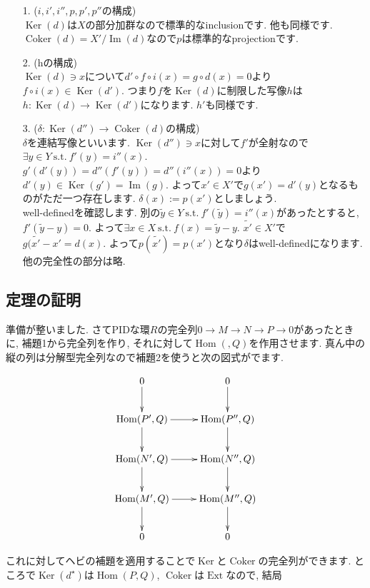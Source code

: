 \documentclass{jsarticle}
\newcommand{\makeop}[1]{\mathop{\mathrm{#1}}\nolimits}
\def\Im{\makeop{Im}}
\def\Ker{\makeop{Ker}}
\def\Hom{\makeop{Hom}}
\def\Ext{\makeop{Ext}}
\def\Coker{\makeop{Coker}}
\def\suchthat{\mathrm{\ s.t.\ }}
\theoremstyle{definition}
\numberwithin{theorem}{section}
\begin{document}
\begin{itemize}
\item[1.] ($i, i', i'', p, p', p''$の構成)\\
$\Ker(d)$は$X$の部分加群なので標準的なinclusionです. 他も同様です. $\Coker(d) = X'/\Im(d)$なので$p$は標準的なprojectionです.

\item[2.] (hの構成)\\
$\Ker(d)\ni x$について$d'\circ f\circ i(x) = g\circ d(x) = 0$より$f\circ i(x) \in \Ker(d')$. つまり$f$を$\Ker(d)$に制限した写像$h$は$h : \Ker(d) \rightarrow \Ker(d')$になります. $h'$も同様です. 

\item[3.] ($\delta: \Ker(d'') \rightarrow \Coker(d)$の構成)\\
$\delta$を連結写像といいます. $\Ker(d'') \ni x$に対して$f'$が全射なので$\exists y \in Y \suchthat f'(y) = i''(x)$. $g'(d'(y)) = d''(f'(y)) = d''(i''(x)) = 0$より$d'(y) \in \Ker(g') = \Im(g)$. よって$x' \in X'$で$g(x') = d'(y)$となるものがただ一つ存在します. $\delta(x) := p(x')$としましょう. \\
well-definedを確認します. 別の$\tilde{y} \in Y \suchthat f'(\tilde{y}) = i''(x)$があったとすると, $f'(\tilde{y} - y) = 0$. よって$\exists x \in X \suchthat f(x) = \tilde{y} - y$. $\tilde{x'} \in X'$で$g(\tilde{x'} - x' = d(x)$. よって$p(\tilde{x'}) = p(x')$となり$\delta$はwell-definedになります. 他の完全性の部分は略.
\end{itemize}

\subsection{定理の証明}
準備が整いました. さてPIDな環$R$の完全列$0 \rightarrow M \rightarrow N \rightarrow P \rightarrow 0$があったときに, 補題1から完全列を作り, それに対して$\Hom(, Q)$を作用させます. 真ん中の縦の列は分解型完全列なので補題2を使うと次の図式がでます.

\begin{equation*}
\xymatrix{
0 \ar[d] & 0 \ar[d]\\
\Hom(P', Q) \ar[r] \ar[d] & \Hom(P'', Q) \ar[d]\\
\Hom(N', Q) \ar[r] \ar[d] & \Hom(N'', Q) \ar[d]\\
\Hom(M', Q) \ar[r] \ar[d] & \Hom(M'', Q) \ar[d]\\
0 & 0\\
}
\end{equation*}

これに対してヘビの補題を適用することで$\Ker$と$\Coker$の完全列ができます. ところで$\Ker(d^\star)$は$\Hom(P, Q)$, $\Coker$は$\Ext$なので, 結局
\end{document}
